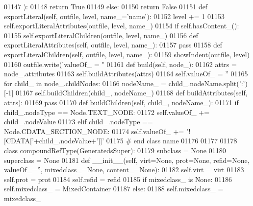 \begin{DoxyCode}
{{{{{{{{{{{{{{{{{{{{{{{{{{{{{{{{{{{{{{{{{{{{{{{{{{{{{{{{{{{{01147             ):
01148             \textcolor{keywordflow}{return} \textcolor{keyword}{True}
01149         \textcolor{keywordflow}{else}:
01150             \textcolor{keywordflow}{return} \textcolor{keyword}{False}
01151     \textcolor{keyword}{def }exportLiteral(self, outfile, level, name\_='name'):
01152         level += 1
01153         self.exportLiteralAttributes(outfile, level, name\_)
01154         \textcolor{keywordflow}{if} self.hasContent_():
01155             self.exportLiteralChildren(outfile, level, name\_)
01156     \textcolor{keyword}{def }exportLiteralAttributes(self, outfile, level, name\_):
01157         \textcolor{keywordflow}{pass}
01158     \textcolor{keyword}{def }exportLiteralChildren(self, outfile, level, name\_):
01159         showIndent(outfile, level)
01160         outfile.write(\textcolor{stringliteral}{'valueOf\_ = "%
01161     \textcolor{keyword}{def }build(self, node\_):
01162         attrs = node\_.attributes
01163         self.buildAttributes(attrs)
01164         self.valueOf_ = \textcolor{stringliteral}{''}
01165         \textcolor{keywordflow}{for} child\_ \textcolor{keywordflow}{in} node\_.childNodes:
01166             nodeName\_ = child\_.nodeName.split(\textcolor{stringliteral}{':'})[-1]
01167             self.buildChildren(child\_, nodeName\_)
01168     \textcolor{keyword}{def }buildAttributes(self, attrs):
01169         \textcolor{keywordflow}{pass}
01170     \textcolor{keyword}{def }buildChildren(self, child\_, nodeName\_):
01171         \textcolor{keywordflow}{if} child\_.nodeType == Node.TEXT\_NODE:
01172             self.valueOf\_ += child\_.nodeValue
01173         \textcolor{keywordflow}{elif} child\_.nodeType == Node.CDATA\_SECTION\_NODE:
01174             self.valueOf\_ += \textcolor{stringliteral}{'![CDATA['}+child\_.nodeValue+\textcolor{stringliteral}{']]'}
01175 \textcolor{comment}{# end class name}
01176 
01177 
01178 \textcolor{keyword}{class }compoundRefType(GeneratedsSuper):
01179     subclass = \textcolor{keywordtype}{None}
01180     superclass = \textcolor{keywordtype}{None}
01181     \textcolor{keyword}{def }__init__(self, virt=None, prot=None, refid=None, valueOf\_='', mixedclass\_=None, content\_=None):
01182         self.virt = virt
01183         self.prot = prot
01184         self.refid = refid
01185         \textcolor{keywordflow}{if} mixedclass\_ \textcolor{keywordflow}{is} \textcolor{keywordtype}{None}:
01186             self.mixedclass_ = MixedContainer
01187         \textcolor{keywordflow}{else}:
01188             self.mixedclass_ = mixedclass\_
}}}}}}}}}}}}}}}}}}}}}}}}}}}}}}}}}}}}}}}}}}}}}}}}}}}}}}}}}}}}}
\end{DoxyCode}
